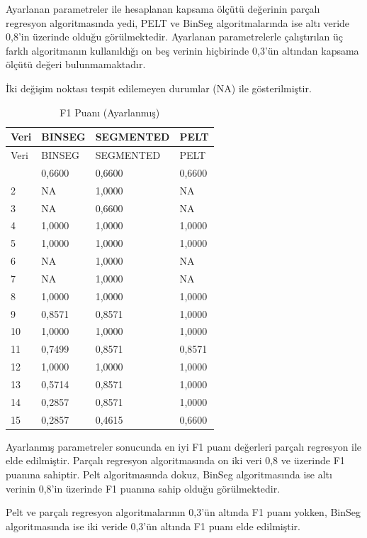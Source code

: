 \documentclass[12pt,twoside]{deuthesis}
\begin{document}
Ayarlanan parametreler ile hesaplanan kapsama ölçütü değerinin parçalı regresyon algoritmasında yedi, PELT ve BinSeg algoritmalarında ise altı veride 0,8'in üzerinde olduğu görülmektedir. Ayarlanan parametrelerle çalıştırılan üç farklı algoritmanın kullanıldığı on beş verinin hiçbirinde 0,3'ün altından kapsama ölçütü değeri bulunmamaktadır.

İki değişim noktası tespit edilemeyen durumlar (NA) ile gösterilmiştir.

\begin{longtable}[]{@{}llll@{}}
\caption{\label{tab:nvar7} F1 Puanı (Ayarlanmış)}\tabularnewline
\toprule\noalign{}
Veri & BINSEG & SEGMENTED & PELT \\
\midrule\noalign{}
\endfirsthead
\toprule\noalign{}
Veri & BINSEG & SEGMENTED & PELT \\
\midrule\noalign{}
\endhead
\bottomrule\noalign{}
\endlastfoot
1 & 0,6600 & 0,6600 & 0,6600 \\
2 & NA & 1,0000 & NA \\
3 & NA & 0,6600 & NA \\
4 & 1,0000 & 1,0000 & 1,0000 \\
5 & 1,0000 & 1,0000 & 1,0000 \\
6 & NA & 1,0000 & NA \\
7 & NA & 1,0000 & NA \\
8 & 1,0000 & 1,0000 & 1,0000 \\
9 & 0,8571 & 0,8571 & 1,0000 \\
10 & 1,0000 & 1,0000 & 1,0000 \\
11 & 0,7499 & 0,8571 & 0,8571 \\
12 & 1,0000 & 1,0000 & 1,0000 \\
13 & 0,5714 & 0,8571 & 1,0000 \\
14 & 0,2857 & 0,8571 & 1,0000 \\
15 & 0,2857 & 0,4615 & 0,6600 \\
\end{longtable}

Ayarlanmış parametreler sonucunda en iyi F1 puanı değerleri parçalı regresyon ile elde edilmiştir. Parçalı regresyon algoritmasında on iki veri 0,8 ve üzerinde F1 puanına sahiptir. Pelt algoritmasında dokuz, BinSeg algoritmasında ise altı verinin 0,8'in üzerinde F1 puanına sahip olduğu görülmektedir.

Pelt ve parçalı regresyon algoritmalarının 0,3'ün altında F1 puanı yokken, BinSeg algoritmasında ise iki veride 0,3'ün altında F1 puanı elde edilmiştir.
\end{document}
